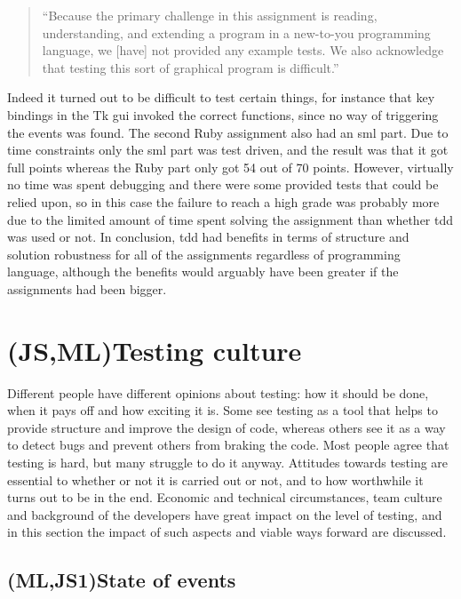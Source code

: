 \documentclass[11pt]{article}
\begin{document}
\begin{quote}
``Because the primary challenge in this assignment is reading, understanding, and extending a program in a new-to-you programming language, we [have] not provided any example tests. We also acknowledge that testing this sort of graphical program is difficult.''
\end{quote}

Indeed it turned out to be difficult to test certain things, for instance that key bindings in the Tk \gls{gui} invoked the correct functions, since no way of triggering the events was found. The second Ruby assignment also had an \gls{sml} part. Due to time constraints only the \gls{sml} part was test driven, and the result was that it got full points whereas the Ruby part only got 54 out of 70 points. However, virtually no time was spent debugging and there were some provided tests that could be relied upon, so in this case the failure to reach a high grade was probably more due to the limited amount of time spent solving the assignment than whether \gls{tdd} was used or not.
In conclusion, \gls{tdd} had benefits in terms of structure and solution robustness for all of the assignments regardless of programming language, although the benefits would arguably have been greater if the assignments had been bigger.


\section{(JS,ML)Testing culture}
\label{sec:testingculture}

Different people have different opinions about testing: how it should be done, when it pays off and how exciting it is. Some see testing as a tool that helps to provide structure and improve the design of code, whereas others see it as a way to detect bugs and prevent others from braking the code. Most people agree that testing is hard, but many struggle to do it anyway. Attitudes towards testing are essential to whether or not it is carried out or not, and to how worthwhile it turns out to be in the end. Economic and technical circumstances, team culture and background of the developers have great impact on the level of testing, and in this section the impact of such aspects and viable ways forward are discussed.

\subsection{(ML,JS1)State of events}
\label{subsec:stateofevents}
\end{document}
